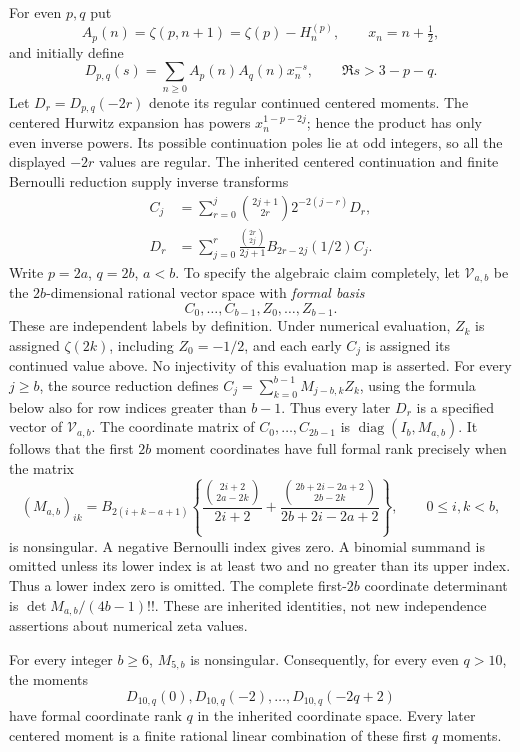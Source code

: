 For even $p,q$ put
\[
 A_p(n)=\zeta(p,n+1)=\zeta(p)-H_n^{(p)},\qquad x_n=n+\tfrac12,
\]
and initially define
\[
 D_{p,q}(s)=\sum_{n\ge0}A_p(n)A_q(n)x_n^{-s},
 \qquad \Re s>3-p-q.
\]
Let $D_r=D_{p,q}(-2r)$ denote its regular continued centered moments.
The centered Hurwitz expansion has powers $x_n^{1-p-2j}$; hence
the product has only even inverse powers. Its possible continuation
poles lie at odd integers, so all the displayed $-2r$ values are regular.
The inherited centered continuation and finite Bernoulli reduction
supply inverse transforms
\begin{align}
 C_j&=\sum_{r=0}^j\binom{2j+1}{2r}2^{-2(j-r)}D_r,
 \label{t10:inverse}\\
 D_r&=\sum_{j=0}^r\frac{\binom{2r}{2j}}{2j+1}
 B_{2r-2j}(1/2)C_j.\label{t10:forward}
\end{align}
Write $p=2a$, $q=2b$, $a<b$. To specify the algebraic claim completely,
let $\mathcal V_{a,b}$ be the $2b$-dimensional rational vector space with
\emph{formal basis}
\[
 C_0,\ldots,C_{b-1},Z_0,\ldots,Z_{b-1}.
\]
These are independent labels by definition. Under numerical evaluation,
$Z_k$ is assigned $\zeta(2k)$, including $Z_0=-1/2$, and each early
$C_j$ is assigned its continued value above. No injectivity of this
evaluation map is asserted. For every $j\ge b$, the source reduction
defines $C_j=\sum_{k=0}^{b-1}M_{j-b,k}Z_k$, using the formula below
also for row indices greater than $b-1$. Thus every later $D_r$ is a
specified vector of $\mathcal V_{a,b}$. The coordinate matrix of
$C_0,\ldots,C_{2b-1}$ is $\operatorname{diag}(I_b,M_{a,b})$.
It follows that the first $2b$ moment coordinates have full formal
rank precisely when the matrix
\begin{equation}\label{t10:M}
 (M_{a,b})_{ik}=B_{2(i+k-a+1)}
 \left\{\frac{\binom{2i+2}{2a-2k}}{2i+2}
 +\frac{\binom{2b+2i-2a+2}{2b-2k}}{2b+2i-2a+2}\right\},
 \qquad0\le i,k<b,
\end{equation}
is nonsingular. A negative Bernoulli index gives zero. A binomial
summand is omitted unless its lower index is at least two and no
greater than its upper index. Thus a lower index zero is omitted.
The complete first-$2b$ coordinate determinant is
$\det M_{a,b}/(4b-1)!!$. These are inherited identities, not new
independence assertions about numerical zeta values.

\begin{theorem}
\label{t10:complete}
For every integer $b\ge6$, $M_{5,b}$ is nonsingular. Consequently,
for every even $q>10$, the moments
\[
 D_{10,q}(0),D_{10,q}(-2),\ldots,D_{10,q}(-2q+2)
\]
have formal coordinate rank $q$ in the inherited coordinate space.
Every later centered moment is a finite rational linear combination
of these first $q$ moments.
\end{theorem}

